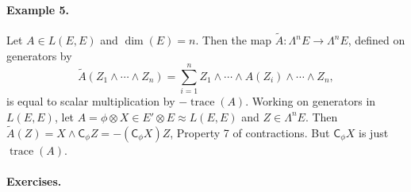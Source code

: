 \paragraph{Example 5.} Let $A\in L(E,E)$ and $\dim(E)=n$. Then the map $\widetilde A:\Lambda^n E\to\Lambda^n E$, defined on generators by
\[
\widetilde A(Z_1\wedge\cdots\wedge Z_n)=\sum_{i=1}^n Z_1\wedge\cdots\wedge A(Z_i)\wedge\cdots\wedge Z_n,
\]
is equal to scalar multiplication by $-\operatorname{trace}(A)$. Working on generators in $L(E,E)$, let $A=\phi\otimes X\in E'\otimes E\approx L(E,E)$ and $Z\in\Lambda^n E$. Then $\widetilde A(Z)=X\wedge\mathsf C_\phi Z=-(\mathsf C_\phi X)Z$, Property 7 of contractions. But $\mathsf C_\phi X$ is just $\operatorname{trace}(A)$.
\paragraph{Exercises.}
